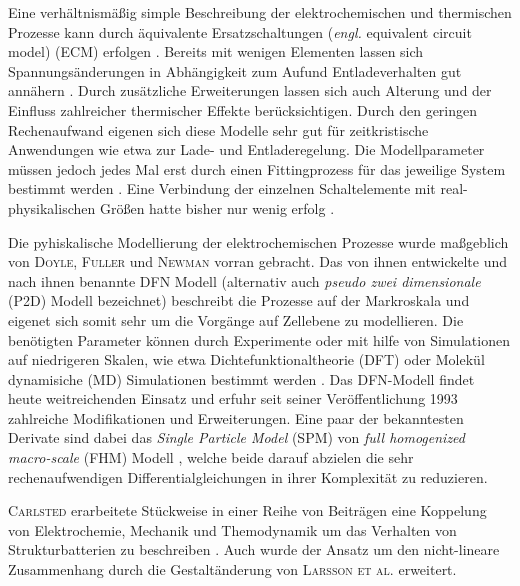 Eine verhältnismäßig simple Beschreibung der elektrochemischen und thermischen Prozesse kann durch äquivalente Ersatzschaltungen (\textit{engl.} equivalent circuit model) (ECM) erfolgen \cite{Bavsic2022}. Bereits mit wenigen Elementen lassen sich Spannungsänderungen in Abhängigkeit zum Aufund Entladeverhalten gut annähern \cite{YannLiaw2004}. Durch zusätzliche Erweiterungen lassen sich auch Alterung und der Einfluss zahlreicher thermischer Effekte berücksichtigen\cite{Hannan2017,Tran2021}.
Durch den geringen Rechenaufwand eigenen sich diese Modelle sehr gut für zeitkristische Anwendungen wie etwa zur Lade- und Entladeregelung. Die Modellparameter müssen jedoch jedes Mal erst durch einen Fittingprozess für das jeweilige System bestimmt werden \cite{Tomasov2019}. Eine Verbindung der einzelnen Schaltelemente mit real-physikalischen Größen hatte bisher nur wenig erfolg \cite{Plett2015}.

Die pyhiskalische Modellierung der elektrochemischen Prozesse wurde maßgeblich von \textsc{Doyle}\cite{Doyle1995,Doyle2003,Ceder2002}, \textsc{Fuller}\cite{Fuller2018,Takeuchi2008} und \textsc{Newman}\cite{Doyle1995,Newman2021} vorran gebracht. Das von ihnen entwickelte und nach ihnen benannte DFN Modell (alternativ auch \textit{pseudo zwei dimensionale} (P2D) Modell bezeichnet) \cite{Doyle1993} beschreibt die Prozesse auf der Markroskala und eigenet sich somit sehr um die Vorgänge auf Zellebene zu modellieren. Die benötigten Parameter können durch Experimente oder mit hilfe von Simulationen auf niedrigeren Skalen, wie etwa Dichtefunktionaltheorie (DFT) oder Molekül dynamisiche (MD) Simulationen bestimmt werden \cite{Chen2022}. Das DFN-Modell findet heute weitreichenden Einsatz und erfuhr seit seiner Veröffentlichung 1993 zahlreiche Modifikationen und Erweiterungen. Eine paar der bekanntesten Derivate sind dabei das \textit{Single Particle Model} (SPM) \cite{Li2017} von \textit{full homogenized macro-scale} (FHM) Modell \cite{Arunachalam2019}, welche beide darauf abzielen die sehr rechenaufwendigen Differentialgleichungen in ihrer Komplexität zu reduzieren. 


\textsc{Carlsted} erarbeitete Stückweise in einer Reihe von Beiträgen eine Koppelung von Elektrochemie, Mechanik und Themodynamik um das Verhalten von Strukturbatterien zu beschreiben \cite{Carlstedt2019,Carlstedt2019a,Carlstedt2019b,Carlstedt2020,Carlstedt2020b, Carlstedt2022,Carlstedt2022a,Carlstedt2022b}. Auch wurde der Ansatz um den nicht-lineare Zusammenhang durch die Gestaltänderung von \textsc{Larsson et al.} \cite{Larsson2023} erweitert. 

